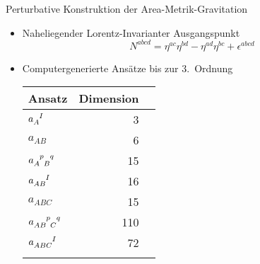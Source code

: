 \documentclass{beamer}
\begin{document}
    \begin{frame}{Perturbative Konstruktion der Area-Metrik-Gravitation}
        \begin{itemize}
            \item Naheliegender Lorentz-Invarianter Ausgangspunkt
            \[
                N^{abcd} = \eta^{ac} \eta^{bd} - \eta^{ad} \eta^{bc} + \epsilon^{abcd}
            \]
            \item Computergenerierte Ansätze bis zur 3.\ Ordnung
            \footnotesize
            \begin{table}
                \centering
                \begin{tabular}{l r r}
                    \toprule
                    Ansatz                                            & Dimension \\
                    \midrule
                    $a_A^{\hphantom AI}$                              & 3         \\ \addlinespace[2pt]
                    $a_{AB}$                                          & 6         \\ \addlinespace[2pt]
                    $a_{A\hphantom pB}^{\hphantom Ap\hphantom Bq}$    & 15        \\ \addlinespace[2pt]
                    $a_{AB}^{\hphantom{AB}I}$                         & 16        \\ \addlinespace[2pt]
                    $a_{ABC}$                                         & 15        \\ \addlinespace[2pt]
                    $a_{AB\hphantom pC}^{\hphantom{AB}p\hphantom Cq}$ & 110       \\ \addlinespace[2pt]
                    $a_{ABC}^{\hphantom{ABC}I}$                       & 72        \\ \addlinespace[2pt]
                    \bottomrule
                \end{tabular}\label{tab:ansaetze}
            \end{table}
        \end{itemize}
    \end{frame}
\end{document}

